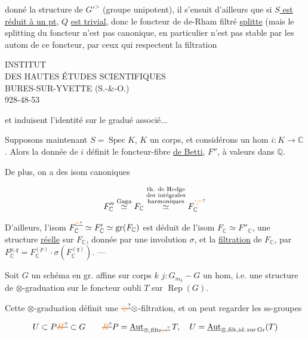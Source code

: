  donné la structure de $G'^{>}$ (groupe unipotent), il s'ensuit d'ailleurs que si \uline{$S$ est réduit à un pt}, $Q$ \uline{est trivial}, donc le foncteur de de-Rham filtré \uline{splitte} (mais le splitting du foncteur n'est pas canonique, en particulier n'est pas stable par les autom de ce foncteur,  par ceux qui respectent la filtration

INSTITUT\\
DES HAUTES ÉTUDES SCIENTIFIQUES\\
BURES-SUR-YVETTE (S.-\&-O.)\\
928-48-53

et induisent l'identité sur le gradué associé$\ldots$

Supposons maintenant $S=\operatorname{Spec} K$, $K$ un corps, et considérons un hom $i:K\longrightarrow\mathbb C$. Alors la donnée de $i$ définit le foncteur-fibre \uline{de Betti},  $F''$, à valeurs dans $\mathbb Q$.

De plus, on a des isom canoniques

\[
F''_{\mathbb C}\overset{\text{Gaga}}{\simeq} F_{\mathbb C}
\overset{\substack{\text{th. de Hodge}\\\text{des intégrales}\\\text{harmoniques}}}{\simeq}
F_{\mathbb C}^{\unsure{'|''}}
\]

D'ailleurs, l'isom $F_{\mathbb C}^{\deleted{\unsure{''}}}\simeq F'_{\mathbb C}\simeq\operatorname{gr}(F_{\mathbb C})$ est déduit de l'isom $F_{\mathbb C}\simeq F''_{\mathbb C}$,  une structure \uline{réelle} sur $F_{\mathbb C}$, donnée par une involution $\sigma$, et la \uline{filtration}  de $F_{\mathbb C}$, par $F^{p,q}_{\mathbb C}=F^{(p)}_{\mathbb C}\cdot\sigma(F^{(q)}_{\mathbb C})$. ---

Soit $G$ un schéma en gr. affine sur corps $k$ $j:G_{m_k}-G$ un hom, i.e. une structure de $\otimes$-graduation sur le foncteur oubli $T$ sur $\operatorname{Rep}(G)$.

Cette $\otimes$-graduation définit une $\deleted{\unsure{\oplus}}\otimes$-filtration, et on peut regarder les ss-groupes

\[
U\subset P\deleted{\unsure{H}}\subset G\qquad
\deleted{\unsure{R}}P=\underline{\mathrm{Aut}}_{\otimes,\mathrm{filtr}\deleted{\unsure{,i}}}\,T,\quad
U=\underline{\mathrm{Aut}}_{\otimes,\mathrm{filt},\mathrm{id.\,sur\,Gr}}(T)
\]

